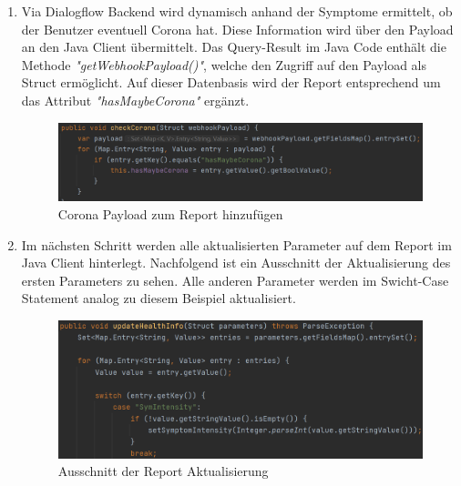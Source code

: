 \documentclass[11pt,a4paper]{article}
\begin{document}
				\begin{enumerate}
					\item Via Dialogflow Backend wird dynamisch anhand der Symptome ermittelt, ob der Benutzer eventuell Corona hat.
						Diese Information wird über den Payload an den Java Client übermittelt. Das Query-Result im Java Code enthält 
						die Methode \emph{"getWebhookPayload()"}, welche den Zugriff auf den Payload als Struct ermöglicht. Auf dieser
						Datenbasis wird der Report entsprechend um das Attribut \emph{"hasMaybeCorona"} ergänzt.
						\begin{figure}[h!]
							\begin{center}
			            		\includegraphics[width=1.0\linewidth]{JavaClient-CoronaCheck.png}
								\caption{Corona Payload zum Report hinzufügen}
								\label{fig:javaClient_coronaCheck}
							\end{center}
						\end{figure}
					
					
					\newpage
					
					
					\item Im nächsten Schritt werden alle aktualisierten Parameter auf dem Report im Java Client hinterlegt. 
						Nachfolgend ist ein Ausschnitt der Aktualisierung des ersten Parameters zu sehen. Alle anderen Parameter 
						werden im Swicht-Case Statement analog zu diesem Beispiel aktualisiert.
						\begin{figure}[h!]
							\begin{center}
			            		\includegraphics[width=0.9\linewidth]{JavaClient-ParameterHandling.png}
								\caption{Ausschnitt der Report Aktualisierung}
								\label{fig:javaClient_parameterHandling}
							\end{center}
						\end{figure}
				\end{enumerate}
		
\end{document}

